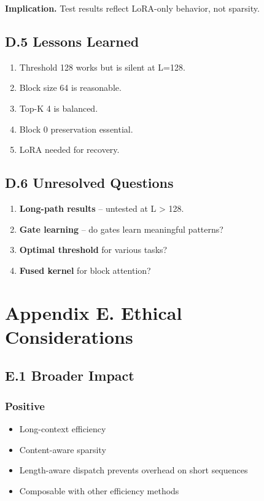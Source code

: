 \textbf{Implication.} Test results reflect LoRA-only behavior, not sparsity.

\subsection{D.5 Lessons Learned}

\begin{enumerate}
\item Threshold 128 works but is silent at L=128.
\item Block size 64 is reasonable.
\item Top-K 4 is balanced.
\item Block 0 preservation essential.
\item LoRA needed for recovery.

\end{enumerate}
\subsection{D.6 Unresolved Questions}

\begin{enumerate}
\item \textbf{Long-path results} -- untested at L > 128.
\item \textbf{Gate learning} -- do gates learn meaningful patterns?
\item \textbf{Optimal threshold} for various tasks?
\item \textbf{Fused kernel} for block attention?

\end{enumerate}


\section{Appendix E. Ethical Considerations}

\subsection{E.1 Broader Impact}

\subsubsection{Positive}
\begin{itemize}
\item Long-context efficiency
\item Content-aware sparsity
\item Length-aware dispatch prevents overhead on short sequences
\item Composable with other efficiency methods

\end{itemize}
